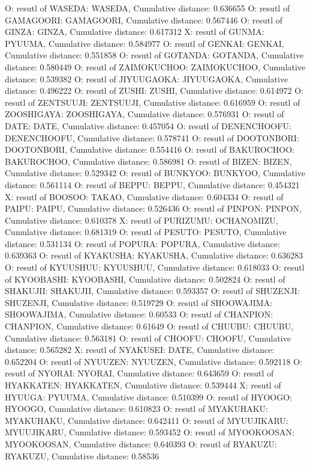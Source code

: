 O: resutl of WASEDA: WASEDA, Cumulative distance: 0.636655
O: resutl of GAMAGOORI: GAMAGOORI, Cumulative distance: 0.567446
O: resutl of GINZA: GINZA, Cumulative distance: 0.617312
X: resutl of GUNMA: PYUUMA, Cumulative distance: 0.584977
O: resutl of GENKAI: GENKAI, Cumulative distance: 0.551858
O: resutl of GOTANDA: GOTANDA, Cumulative distance: 0.580449
O: resutl of ZAIMOKUCHOO: ZAIMOKUCHOO, Cumulative distance: 0.539382
O: resutl of JIYUUGAOKA: JIYUUGAOKA, Cumulative distance: 0.496222
O: resutl of ZUSHI: ZUSHI, Cumulative distance: 0.614972
O: resutl of ZENTSUUJI: ZENTSUUJI, Cumulative distance: 0.616959
O: resutl of ZOOSHIGAYA: ZOOSHIGAYA, Cumulative distance: 0.576931
O: resutl of DATE: DATE, Cumulative distance: 0.457054
O: resutl of DENENCHOOFU: DENENCHOOFU, Cumulative distance: 0.578741
O: resutl of DOOTONBORI: DOOTONBORI, Cumulative distance: 0.554416
O: resutl of BAKUROCHOO: BAKUROCHOO, Cumulative distance: 0.586981
O: resutl of BIZEN: BIZEN, Cumulative distance: 0.529342
O: resutl of BUNKYOO: BUNKYOO, Cumulative distance: 0.561114
O: resutl of BEPPU: BEPPU, Cumulative distance: 0.454321
X: resutl of BOOSOO: TAKAO, Cumulative distance: 0.604334
O: resutl of PAIPU: PAIPU, Cumulative distance: 0.526436
O: resutl of PINPON: PINPON, Cumulative distance: 0.610378
X: resutl of PURIZUMU: OCHANOMIZU, Cumulative distance: 0.681319
O: resutl of PESUTO: PESUTO, Cumulative distance: 0.531134
O: resutl of POPURA: POPURA, Cumulative distance: 0.639363
O: resutl of KYAKUSHA: KYAKUSHA, Cumulative distance: 0.636283
O: resutl of KYUUSHUU: KYUUSHUU, Cumulative distance: 0.618033
O: resutl of KYOOBASHI: KYOOBASHI, Cumulative distance: 0.502824
O: resutl of SHAKUJII: SHAKUJII, Cumulative distance: 0.593357
O: resutl of SHUZENJI: SHUZENJI, Cumulative distance: 0.519729
O: resutl of SHOOWAJIMA: SHOOWAJIMA, Cumulative distance: 0.60533
O: resutl of CHANPION: CHANPION, Cumulative distance: 0.61649
O: resutl of CHUUBU: CHUUBU, Cumulative distance: 0.563181
O: resutl of CHOOFU: CHOOFU, Cumulative distance: 0.565282
X: resutl of NYAKUSEI: DATE, Cumulative distance: 0.652204
O: resutl of NYUUZEN: NYUUZEN, Cumulative distance: 0.592118
O: resutl of NYORAI: NYORAI, Cumulative distance: 0.643659
O: resutl of HYAKKATEN: HYAKKATEN, Cumulative distance: 0.539444
X: resutl of HYUUGA: PYUUMA, Cumulative distance: 0.510399
O: resutl of HYOOGO: HYOOGO, Cumulative distance: 0.610823
O: resutl of MYAKUHAKU: MYAKUHAKU, Cumulative distance: 0.642411
O: resutl of MYUUJIKARU: MYUUJIKARU, Cumulative distance: 0.593452
O: resutl of MYOOKOOSAN: MYOOKOOSAN, Cumulative distance: 0.640393
O: resutl of RYAKUZU: RYAKUZU, Cumulative distance: 0.58536
